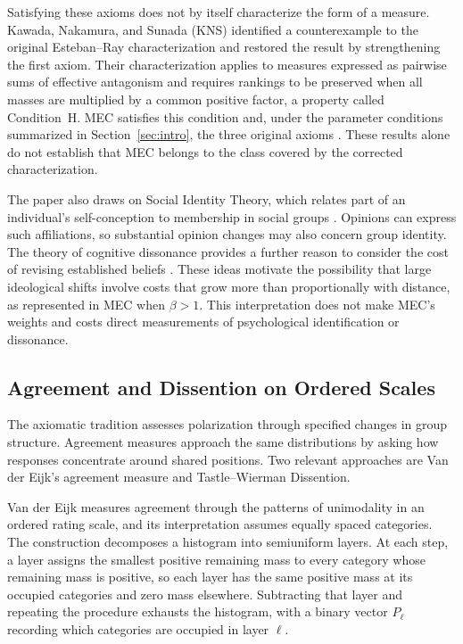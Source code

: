 \documentclass{article}
\theoremstyle{plain}
\theoremstyle{remark}
\begin{document}
Satisfying these axioms does not by itself characterize the form of a measure. Kawada, Nakamura, and Sunada (KNS) \citep{kawada2018characterization} identified a counterexample to the original Esteban--Ray characterization and restored the result by strengthening the first axiom. Their characterization applies to measures expressed as pairwise sums of effective antagonism and requires rankings to be preserved when all masses are multiplied by a common positive factor, a property called Condition~H. MEC satisfies this condition and, under the parameter conditions summarized in Section~\ref{sec:intro}, the three original axioms \citep{aranda2026mec}. These results alone do not establish that MEC belongs to the class covered by the corrected characterization.

The paper also draws on Social Identity Theory, which relates part of an individual's self-conception to membership in social groups \citep{TajfelTurner1979}. Opinions can express such affiliations, so substantial opinion changes may also concern group identity. The theory of cognitive dissonance provides a further reason to consider the cost of revising established beliefs \citep{Festinger1957}. These ideas motivate the possibility that large ideological shifts involve costs that grow more than proportionally with distance, as represented in MEC when $\beta>1$. This interpretation does not make MEC's weights and costs direct measurements of psychological identification or dissonance.

\subsection{Agreement and Dissention on Ordered Scales}\label{subsec:lit-ordinal}

The axiomatic tradition assesses polarization through specified changes in group structure. Agreement measures approach the same distributions by asking how responses concentrate around shared positions. Two relevant approaches are Van der Eijk's agreement measure and Tastle--Wierman Dissention.

Van der Eijk \citep{van2001measuring} measures agreement through the patterns of unimodality in an ordered rating scale, and its interpretation assumes equally spaced categories. The construction decomposes a histogram into semiuniform layers. At each step, a layer assigns the smallest positive remaining mass to every category whose remaining mass is positive, so each layer has the same positive mass at its occupied categories and zero mass elsewhere. Subtracting that layer and repeating the procedure exhausts the histogram, with a binary vector $P_\ell$ recording which categories are occupied in layer $\ell$.
\end{document}
